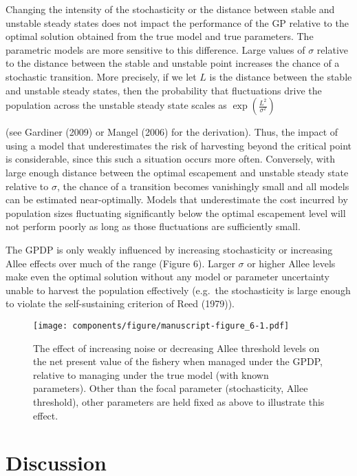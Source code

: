 \documentclass[author-year, 12pt,review]{components/elsarticle} %
\makeatletter
\def\maxwidth{\ifdim\Gin@nat@width>\linewidth\linewidth
\else\Gin@nat@width\fi}
\let\Oldincludegraphics\includegraphics
\renewcommand{\includegraphics}[1]{\Oldincludegraphics[width=\maxwidth]{#1}}
\makeatother
\begin{document}
Changing the intensity of the stochasticity or the distance between
stable and unstable steady states does not impact the performance of the
GP relative to the optimal solution obtained from the true model and
true parameters. The parametric models are more sensitive to this
difference. Large values of $\sigma$ relative to the distance between
the stable and unstable point increases the chance of a stochastic
transition. More precisely, if we let $L$ is the distance between the
stable and unstable steady states, then the probability that
fluctuations drive the population across the unstable steady state
scales as $\exp\left(\frac{L^2}{\sigma^2}\right)$

(see Gardiner (2009) or Mangel (2006) for the derivation). Thus, the
impact of using a model that underestimates the risk of harvesting
beyond the critical point is considerable, since this such a situation
occurs more often. Conversely, with large enough distance between the
optimal escapement and unstable steady state relative to $\sigma$, the
chance of a transition becomes vanishingly small and all models can be
estimated near-optimally. Models that underestimate the cost incurred by
population sizes fluctuating significantly below the optimal escapement
level will not perform poorly as long as those fluctuations are
sufficiently small.

The GPDP is only weakly influenced by increasing stochasticity or
increasing Allee effects over much of the range (Figure 6). Larger
$\sigma$ or higher Allee levels make even the optimal solution without
any model or parameter uncertainty unable to harvest the population
effectively (e.g.~the stochasticity is large enough to violate the
self-sustaining criterion of Reed (1979)).

\begin{figure}[htbp]
\centering
\texttt{[image: components/figure/manuscript-figure\_6-1.pdf]}
\caption{The effect of increasing noise or decreasing Allee threshold
levels on the net present value of the fishery when managed under the
GPDP, relative to managing under the true model (with known parameters).
Other than the focal parameter (stochasticity, Allee threshold), other
parameters are held fixed as above to illustrate this effect.}
\end{figure}

\section{Discussion}\label{discussion}
\end{document}

